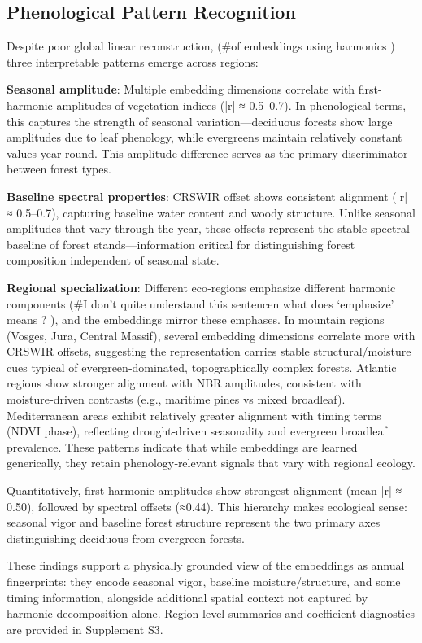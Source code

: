 \documentclass[utf8]{FrontiersinHarvard}
\begin{document}
\subsection{Phenological Pattern Recognition}

Despite poor global linear reconstruction, (#of embeddings using harmonics ) three interpretable patterns emerge across regions:

\textbf{Seasonal amplitude}: Multiple embedding dimensions correlate with first-harmonic amplitudes of vegetation indices (|r| ≈ 0.5–0.7). In phenological terms, this captures the strength of seasonal variation—deciduous forests show large amplitudes due to leaf phenology, while evergreens maintain relatively constant values year-round. This amplitude difference serves as the primary discriminator between forest types.

\textbf{Baseline spectral properties}: CRSWIR offset shows consistent alignment (|r| ≈ 0.5–0.7), capturing baseline water content and woody structure. Unlike seasonal amplitudes that vary through the year, these offsets represent the stable spectral baseline of forest stands—information critical for distinguishing forest composition independent of seasonal state.

\textbf{Regional specialization}: Different eco‑regions emphasize different harmonic components (#I don’t quite understand this sentencen what does ‘emphasize’ means ? ), and the embeddings mirror these emphases. In mountain regions (Vosges, Jura, Central Massif), several embedding dimensions correlate more with CRSWIR offsets, suggesting the representation carries stable structural/moisture cues typical of evergreen‑dominated, topographically complex forests. Atlantic regions show stronger alignment with NBR amplitudes, consistent with moisture‑driven contrasts (e.g., maritime pines vs mixed broadleaf). Mediterranean areas exhibit relatively greater alignment with timing terms (NDVI phase), reflecting drought‑driven seasonality and evergreen broadleaf prevalence. These patterns indicate that while embeddings are learned generically, they retain phenology‑relevant signals that vary with regional ecology.

Quantitatively, first-harmonic amplitudes show strongest alignment (mean |r| ≈ 0.50), followed by spectral offsets (≈0.44). This hierarchy makes ecological sense: seasonal vigor and baseline forest structure represent the two primary axes distinguishing deciduous from evergreen forests.

These findings support a physically grounded view of the embeddings as annual fingerprints: they encode seasonal vigor, baseline moisture/structure, and some timing information, alongside additional spatial context not captured by harmonic decomposition alone. Region-level summaries and coefficient diagnostics are provided in Supplement S3.
\end{document}
